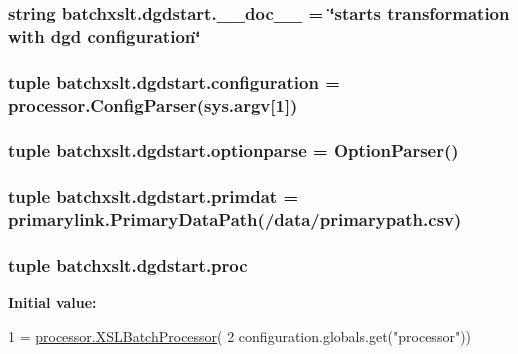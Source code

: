 \subsubsection[{\+\_\+\+\_\+doc\+\_\+\+\_\+}]{\setlength{\rightskip}{0pt plus 5cm}string batchxslt.\+dgdstart.\+\_\+\+\_\+doc\+\_\+\+\_\+ = \char`\"{}starts transformation with dgd {\bf configuration}\char`\"{}}\label{namespacebatchxslt_1_1dgdstart_aa8f35e0a923480eaab98e43f2cf57ea0}
\hypertarget{namespacebatchxslt_1_1dgdstart_ae6be486e81d6e57d3022155e412359f2}{}
\subsubsection[{configuration}]{\setlength{\rightskip}{0pt plus 5cm}tuple batchxslt.\+dgdstart.\+configuration = {\bf processor.\+Config\+Parser}(sys.\+argv\mbox{[}1\mbox{]})}\label{namespacebatchxslt_1_1dgdstart_ae6be486e81d6e57d3022155e412359f2}
\hypertarget{namespacebatchxslt_1_1dgdstart_a44ebd956e1c7db721b0536ccd3532068}{}
\subsubsection[{optionparse}]{\setlength{\rightskip}{0pt plus 5cm}tuple batchxslt.\+dgdstart.\+optionparse = Option\+Parser()}\label{namespacebatchxslt_1_1dgdstart_a44ebd956e1c7db721b0536ccd3532068}
\hypertarget{namespacebatchxslt_1_1dgdstart_a79662ea2cdd3dd916d9d7fa95876c1ae}{}
\subsubsection[{primdat}]{\setlength{\rightskip}{0pt plus 5cm}tuple batchxslt.\+dgdstart.\+primdat = {\bf primarylink.\+Primary\+Data\+Path}(\textquotesingle{}/data/primarypath.\+csv\textquotesingle{})}\label{namespacebatchxslt_1_1dgdstart_a79662ea2cdd3dd916d9d7fa95876c1ae}
\hypertarget{namespacebatchxslt_1_1dgdstart_ab27d760c7fa3cb3833b6993c821ce2d8}{}
\subsubsection[{proc}]{\setlength{\rightskip}{0pt plus 5cm}tuple batchxslt.\+dgdstart.\+proc}\label{namespacebatchxslt_1_1dgdstart_ab27d760c7fa3cb3833b6993c821ce2d8}
{\bfseries Initial value\+:}
\begin{DoxyCode}
1 = \hyperlink{classbatchxslt_1_1processor_1_1_x_s_l_batch_processor}{processor.XSLBatchProcessor}(
2     configuration.globals.get(\textcolor{stringliteral}{"processor"}))
\end{DoxyCode}
